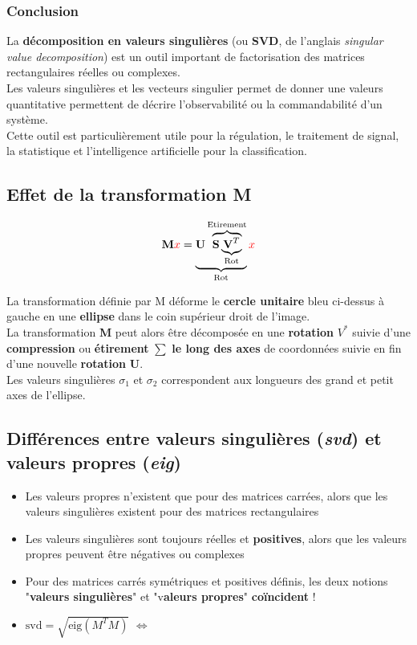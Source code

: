 \documentclass[document.tex]{subfiles}
\begin{document}
\subsubsection{Conclusion}

La \textbf{décomposition en valeurs singulières} (ou \textbf{SVD}, de l'anglais \textit{singular value decomposition}) est un outil important de factorisation des matrices rectangulaires réelles ou complexes.\\

Les valeurs singulières et les vecteurs singulier permet de donner une valeurs quantitative permettent de décrire l'observabilité ou la commandabilité d'un système.\\

Cette outil est particulièrement utile pour la régulation, le traitement de signal, la statistique et l'intelligence artificielle pour la classification.

\subsection{Effet de la transformation M}


$$\textbf{M}\textcolor{red}{x} = \underbrace{\textbf{U}\overbrace{\textbf{S}\underbrace{\textbf{V}^T}_{\text{Rot}}}^{\text{Etirement}}}_{\text{Rot}}\textcolor{red}{x}$$

La transformation définie par M déforme le \textbf{cercle unitaire} bleu ci-dessus à gauche en une
\textbf{ellipse} dans le coin supérieur droit de l'image.\\
La transformation \textbf{M} peut alors être décomposée en une \textbf{rotation} $V^*$ suivie d'une \textbf{compression}
ou \textbf{étirement} $\sum$ \textbf{le long des axes} de coordonnées suivie en fin d'une nouvelle \textbf{rotation} \textbf{U}.\\
Les valeurs singulières $\sigma_1$ et $\sigma_2$ correspondent aux longueurs des grand et petit axes de l'ellipse.

\subsection{Différences entre valeurs singulières (\textit{svd}) et valeurs propres (\textit{eig})}

\begin{itemize}
\item Les valeurs propres n'existent que pour des matrices carrées, alors que les valeurs singulières existent pour des matrices rectangulaires
\item Les valeurs singulières sont toujours réelles et \textbf{positives}, alors que les valeurs propres peuvent être négatives ou complexes
\item Pour des matrices carrés symétriques et positives définis, les deux notions "\textbf{valeurs singulières}" et "v\textbf{aleurs propres}" \textbf{coïncident} !
\item $\text{svd}=\sqrt{\text{eig}(M^T M)}$ $\Longleftrightarrow$ 
\end{itemize}
\end{document}
